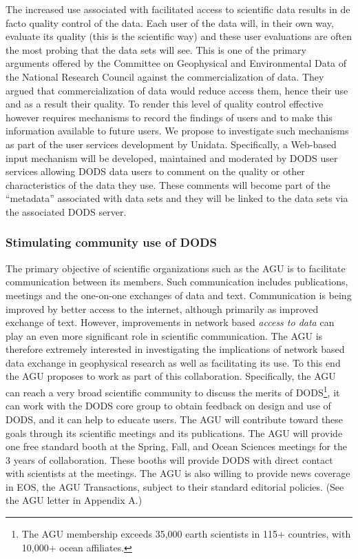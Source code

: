 \documentclass[12pt]{article}
\begin{document}
The increased use associated with facilitated access to scientific 
data results in de facto quality control of the data. Each user of 
the data will, in their own way, evaluate its quality (this is the 
scientific way) and these user evaluations are often the most probing 
that the data sets will see. This is one of the primary arguments 
offered by the Committee on Geophysical and Environmental Data of 
the National Research Council against the commercialization of data. 
They argued that commercialization of data would reduce access them, 
hence their use and as a result their quality.
To render this level of quality control effective however requires 
mechanisms to record the findings of users and to make this 
information available to future users. We propose to investigate 
such mechanisms as part of the user services development by Unidata.
Specifically, a Web-based input mechanism will be developed, 
maintained and moderated by \ac{DODS} user services allowing \ac{DODS} 
data users to comment on the quality or other characteristics of 
the data they use.  These comments will become part of the ``metadata'' 
associated with data sets and they will be linked to the data sets 
via the associated \ac{DODS} server.

\subsubsection{Stimulating community use of \ac{DODS}}
\label{stimulating-community}

The primary objective of scientific organizations such as the \ac{AGU} 
is to facilitate communication between its members. Such communication 
includes publications, meetings and the one-on-one exchanges of data 
and text. Communication is being improved by better access to the 
internet, although primarily as improved exchange of text. However, 
improvements in network based \emph{access to data} can play an even 
more significant role in scientific communication. The \ac{AGU} is 
therefore extremely interested in investigating the implications of 
network based data exchange in geophysical research as well as 
facilitating its use. To this end the \ac{AGU} proposes to work as part 
of this collaboration. Specifically, the \ac{AGU} can reach a very 
broad scientific community to discuss the merits of 
\ac{DODS}\footnote{The \ac{AGU} membership exceeds 35,000 
earth scientists in 115$+$ countries, with 10,000$+$ ocean 
affiliates.}, it can work with the \ac{DODS} core group to obtain 
feedback on design and use of \ac{DODS}, and it can help to educate 
users. The \ac{AGU} will contribute toward these goals through
its scientific meetings and its publications. The \ac{AGU} will 
provide one free standard booth at the Spring, Fall, and Ocean 
Sciences meetings for the 3 years of collaboration. These booths will 
provide \ac{DODS} with direct contact with scientists at the meetings. 
The \ac{AGU} is also willing to provide news coverage in \acs{EOS}, 
the \ac{AGU} Transactions, subject to their standard editorial policies.
(See the \ac{AGU} letter in Appendix A.)
\end{document}
